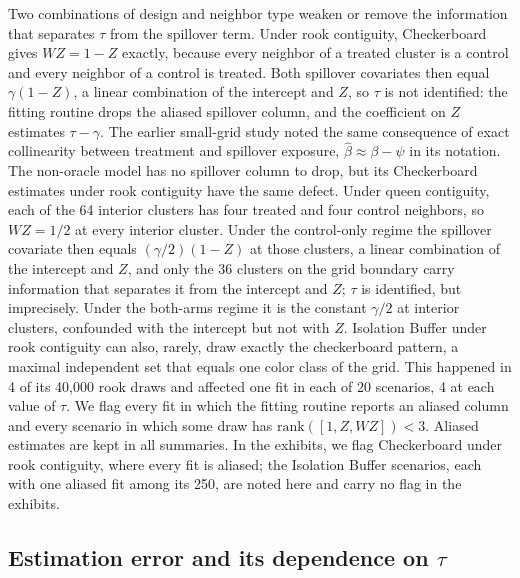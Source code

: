 \documentclass[11pt]{article}
\begin{document}
Two combinations of design and neighbor type weaken or remove the
information that separates \(\tau\) from the spillover term. Under rook
contiguity, Checkerboard gives \(WZ = 1 - Z\) exactly, because every
neighbor of a treated cluster is a control and every neighbor of a
control is treated. Both spillover covariates then equal
\(\gamma(1 - Z)\), a linear combination of the intercept and \(Z\), so
\(\tau\) is not identified: the fitting routine drops the aliased
spillover column, and the coefficient on \(Z\) estimates
$\tau - \gamma$. The earlier small-grid study noted the same
consequence of exact collinearity between treatment and spillover
exposure, \(\hat\beta \approx \beta - \psi\) in its notation. The
non-oracle model has no spillover column to drop, but its Checkerboard
estimates under rook contiguity have the same defect. Under queen
contiguity, each of the 64 interior clusters has four treated and four
control neighbors, so \(WZ = 1/2\) at every interior cluster. Under the
control-only regime the spillover covariate then equals
\((\gamma/2)(1 - Z)\) at those clusters, a linear combination of the
intercept and \(Z\), and only the 36 clusters on the grid boundary carry
information that separates it from the intercept and \(Z\); \(\tau\) is
identified, but imprecisely. Under the both-arms regime it is the
constant \(\gamma/2\) at interior clusters, confounded with the
intercept but not with \(Z\). Isolation Buffer under rook contiguity can
also, rarely, draw exactly the checkerboard pattern, a maximal
independent set that equals one color class of the grid. This happened
in 4 of its 40,000 rook draws and affected one fit in each of 20
scenarios, 4 at each value of \(\tau\). We flag every fit in which the
fitting routine reports an aliased column and every scenario in which
some draw has \(\text{rank}([1, Z, WZ]) < 3\). Aliased estimates are
kept in all summaries. In the exhibits, we flag Checkerboard under rook
contiguity, where every fit is aliased; the Isolation Buffer scenarios,
each with one aliased fit among its 250, are noted here and carry no
flag in the exhibits.

\subsection{\texorpdfstring{Estimation error and its dependence on
\(\tau\)}{Estimation error and its dependence on \textbackslash tau}}\label{estimation-error-and-its-dependence-on-tau}
\end{document}
